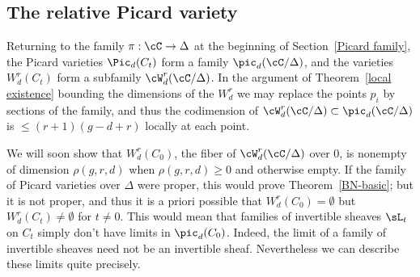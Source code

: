 
\subsection{The relative Picard variety}

Returning to the family $\pi : \cC \to \Delta$ at the beginning of Section~\ref{Picard family}, the Picard varieties $\Pic_d(C_t)$ form a family $\pic_d(\cC/\Delta)$, and the varieties $W^r_d(C_t)$ form a subfamily $\cW^r_d(\cC/\Delta)$.  In the argument
of Theorem~\ref{local existence} bounding  the dimensions of the $W^r_d$
we may replace the points $p_i$ by sections of the family, and thus
the codimension of $\cW^r_d(\cC/\Delta) \subset \pic_d(\cC/\Delta)$ is $\leq (r+1)(g-d+r)$ locally at each point.

We will soon show that $W^{r}_{d}(C_{0})$, the fiber of $\cW^{r}_{d}(\cC/\Delta)$ over 0,  is nonempty of dimension $\rho(g,r,d)$ when $\rho(g,r,d)\geq 0$ and otherwise empty. If the family of Picard varieties over $\Delta$ were proper,
this would prove Theorem~\ref{BN-basic}; but it is not proper, and thus it is a priori possible that $W^{r}_{d}(C_{0})=\emptyset$ but $W^{r}_{d}(C_{t})\neq \emptyset$ for $t\neq 0$. This would mean that families of invertible sheaves $\sL_{t}$ on $C_{t}$  simply don't have  limits
in $\pic_{d}(C_{0})$. Indeed, the limit of a family of invertible sheaves need not be an invertible
sheaf. Nevertheless we can describe these limits quite precisely.



